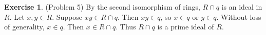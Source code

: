 \documentclass[12pt, psamsfonts]{amsart}
\theoremstyle{definition}
\newtheorem*{exer}{Exercise}
\theoremstyle{remark}
\numberwithin{equation}{section}
\begin{document}
\begin{exer}{(Problem 5)}
  By the second isomorphism of rings, $R \cap q$ is an ideal in $R$.
  Let $x, y \in R$.
  Suppose $xy \in R \cap q$.
  Then $xy \in q$, so $x \in q$ or $y \in q$.
  Without loss of generality, $x \in q$.
  Then $x \in R \cap q$.
  Thus $R \cap q$ is a prime ideal of $R$.
\end{exer}
\end{document}
